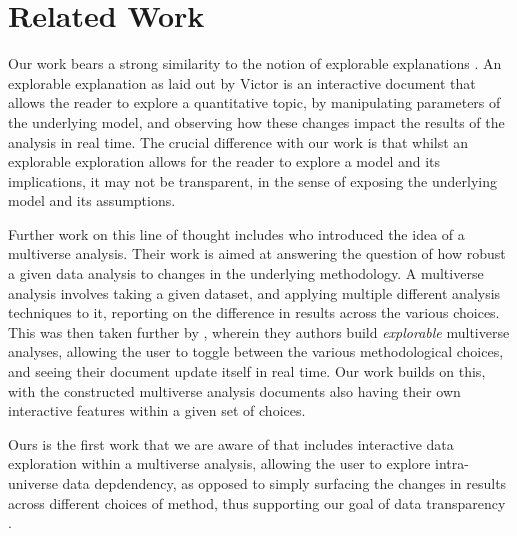 \section{Related Work}
\label{sec:related}

Our work bears a strong similarity to the notion of explorable explanations \cite{victor11b}. An explorable
explanation as laid out by Victor is an interactive document that allows the reader to explore a quantitative
topic, by manipulating parameters of the underlying model, and observing how these changes impact the results
of the analysis in real time. The crucial difference with our work is that whilst an explorable exploration
allows for the reader to explore a model and its implications, it may not be transparent, in the sense of
exposing the underlying model and its assumptions.

Further work on this line of thought includes \cite{steegen16} who introduced the idea of a multiverse
analysis. Their work is aimed at answering the question of how robust a given data analysis to changes in the
underlying methodology. A multiverse analysis involves taking a given dataset, and applying multiple different
analysis techniques to it, reporting on the difference in results across the various choices. This was then
taken further by \cite{dragicevic19}, wherein they authors build \textit{explorable} multiverse analyses,
allowing the user to toggle between the various methodological choices, and seeing their document update
itself in real time. Our work builds on this, with the constructed multiverse analysis documents also having
their own interactive features within a given set of choices.

Ours is the first work that we are aware of that includes interactive data exploration within a multiverse
analysis, allowing the user to explore intra-universe data depdendency, as opposed to simply surfacing the
changes in results across different choices of method, thus supporting our goal of data transparency .